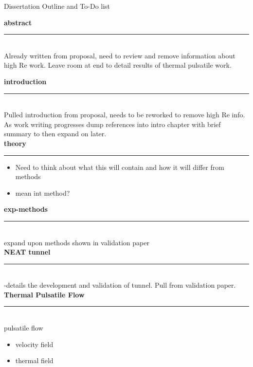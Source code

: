 \documentclass[11pt]{article}
\begin{document}
\begin{center}
Dissertation Outline and To-Do list\\
\end{center}

{\bf abstract}
\vspace{-.5cm}
\newline
\noindent\rule{8cm}{0.4pt}\\
Already written from proposal, need to review and remove information about high Re work.
Leave room at end to detail results of thermal pulsatile work.\\
\vspace{.5cm}


{\bf introduction}
\vspace{-.5cm}
\newline
\noindent\rule{8cm}{0.4pt}\\
Pulled introduction from proposal, needs to be reworked to remove high Re info.
As work writing progresses dump references into intro chapter with brief summary to then expand on later.\\


{\bf theory}
\vspace{-.5cm}
\newline
\noindent\rule{8cm}{0.4pt}
\begin{itemize}
\item Need to think about what this will contain and how it will differ from methods
\item mean int method?
\end{itemize}



{\bf exp-methods}
\vspace{-.5cm}
\newline
\noindent\rule{8cm}{0.4pt}\\
expand upon methods shown in validation paper\\



{\bf NEAT tunnel}
\vspace{-.5cm}
\newline
\noindent\rule{8cm}{0.4pt}\\
-details the development and validation of tunnel.
Pull from validation paper.\\



{\bf Thermal Pulsatile Flow}
\vspace{-.5cm}
\newline
\noindent\rule{8cm}{0.4pt}\\
pulsatile flow
\begin{itemize}
\item velocity field
\item thermal field
\end{itemize}
\end{document}
